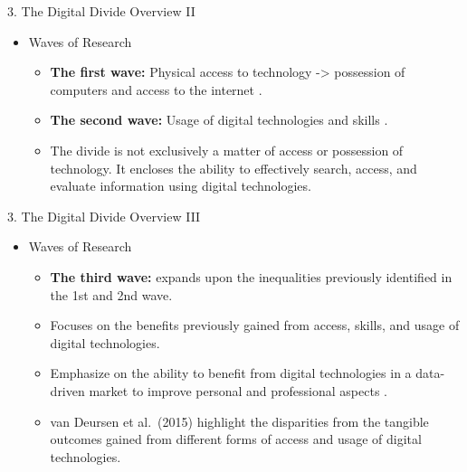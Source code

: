 \documentclass[
  ignorenonframetext,
]{beamer}
\providecommand{\tightlist}{%
  \setlength{\itemsep}{0pt}\setlength{\parskip}{0pt}}
\begin{document}
\begin{frame}{3. The Digital Divide Overview II}
\protect\hypertarget{the-digital-divide-overview-ii}{}
\begin{itemize}
\tightlist
\item
  Waves of Research

  \begin{itemize}
  \item
    \textbf{The first wave:} Physical access to technology
    -\textgreater{} possession of computers and access to the internet
    \citep{vandijk2003}.
  \item
    \textbf{The second wave:} Usage of digital technologies and skills
    \citep{vandijk2006}.
  \item
    The divide is not exclusively a matter of access or possession of
    technology. It encloses the ability to effectively search, access,
    and evaluate information using digital technologies.
  \end{itemize}
\end{itemize}
\end{frame}

\begin{frame}{3. The Digital Divide Overview III}
\protect\hypertarget{the-digital-divide-overview-iii}{}
\begin{itemize}
\tightlist
\item
  Waves of Research

  \begin{itemize}
  \item
    \textbf{The third wave:} expands upon the inequalities previously
    identified in the 1st and 2nd wave.
  \item
    Focuses on the benefits previously gained from access, skills, and
    usage of digital technologies.
  \item
    Emphasize on the ability to benefit from digital technologies in a
    data-driven market to improve personal and professional aspects
    \citep{ragnedda2017}.
  \item
    van Deursen et al.~(2015) highlight the disparities from the
    tangible outcomes gained from different forms of access and usage of
    digital technologies.
  \end{itemize}
\end{itemize}
\end{frame}
\end{document}
